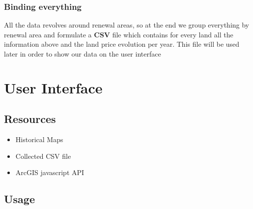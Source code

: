 \documentclass[12pt]{article}
\begin{document}
\subsubsection{Binding everything}
All the data revolves around renewal areas, so at the end we group everything by renewal area and formulate a \textbf{CSV} file which contains for every land all the information above and the land price evolution per year. This file will be used later in order to show our data on the user interface

\section{User Interface}
\subsection{Resources}
\begin{itemize}
\item Historical Maps
\item Collected CSV file
\item ArcGIS javascript API
\end{itemize}

\subsection{Usage}
\end{document}
